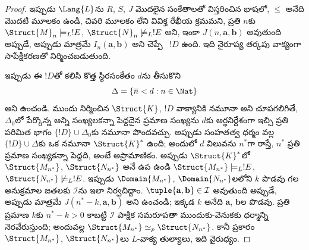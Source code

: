 \documentclass[../../../include/open-logic-section]{subfiles}
\begin{document}
\begin{proof}
ఇప్పుడు $\Lang{L}$ను $R$, $S$, $J$ మొదలైన సంకేతాలతో విస్తరించిన
భాషలో, $\le$ అనేది మొదటి మూలకం ఉండి, చివరి మూలకం లేని వివిక్త
రేఖీయ క్రమమని, ప్రతి $n$కు $\Struct{M}_n\models_L!E$,
$\Struct{N}_n\not\models_L!E$ అని, ఇంకా
$J(n,\mathbf{a},\mathbf{b})$ అవుతుంది అప్పుడే, అప్పుడు మాత్రమే
$I_n(\mathbf{a},\mathbf{b})$ అని చెప్పే
~$!D$ ఉంది. ఇది
 నైరూప్య తర్కపు వాక్యంగా
సాపేక్షీకరణతో నిర్మించబడుతుంది.

ఇప్పుడు ఈ $!D$తో కలిసి కొత్త స్థిరసంకేతం $d$ను తీసుకొని
\[
\Delta=\{\overline{n}<d:n\in\Nat\}
\]
అని ఉంచండి. ముందు నిర్మించిన $\Struct{K}$, $!D$ వాక్యానికి నమూనా అని
చూపగలిగితే, $\Delta_0$లో పేర్కొన్న అన్ని సంఖ్యలకన్నా పెద్దదైన
ప్రమాణ సంఖ్యను $d$కు అర్థనిర్దేశంగా ఇచ్చి ప్రతి పరిమిత భాగం
$\{!D\}\cup\Delta_0$కు నమూనా పొందవచ్చు.
అప్పుడు సంహతత్వ ధర్మం వల్ల $\{!D\}\cup\Delta$కు
ఒక నమూనా $\Struct{K}^*$ ఉంది; అందులో $d$ విలువను $n^*$గా
రాస్తే, $n^*$ ప్రతి ప్రమాణ సంఖ్యకన్నా పెద్దది, అంటే అప్రామాణికం.
%
%
%
%
%
%
%
అప్పుడు $\Struct{K}^*$లో $\Struct{M_{n^*}}$,
$\Struct{N_{n^*}}$ అనే ఉప\- ఉండి
$\Struct{M_{n^*}}\models_L!E$, $\Struct{N_{n^*}}\not\models_L!E$.
ఇప్పుడు $\Domain{M_{n^*}}$, $\Domain{N_{n^*}}$లలోని $k$ పొడవు గల
అనుక్రమాల జతలకు $\mathcal{I}$ను ఇలా నిర్వచిద్దాం. $\tuple{\mathbf{a},\mathbf{b}}\in\mathcal{I}$ అవుతుంది
అప్పుడే, అప్పుడు మాత్రమే $J(n^*-k,\mathbf{a},\mathbf{b})$ అని ఉంచండి; ఇక్కడ $k$ అనేది
$\mathbf{a}$, $\mathbf{b}$ల పొడవు. ప్రతి ప్రమాణ $k$కు
$n^*-k>0$ కాబట్టి
$\mathcal{I}$ పాక్షిక సమరూపతా ముందుకు-వెనుకకు ధర్మాన్ని
నెరవేరుస్తుంది; అందువల్ల
$\Struct{M_{n^*}}\simeq_p\Struct{N_{n^*}}$. కానీ
 ప్రకారం $\Struct{M_{n^*}}$,
$\Struct{N_{n^*}}$లు $L$-వాక్య తుల్యాలు,
ఇది వైరుధ్యం.
\end{proof}
\end{document}
